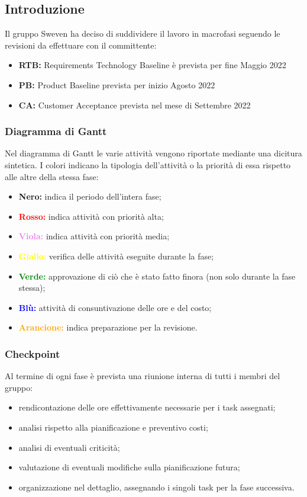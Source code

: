 \subsection{Introduzione}
Il gruppo Sweven ha deciso di suddividere il lavoro in macrofasi seguendo le revisioni da effettuare con il committente:
\begin{itemize}
    \item \textbf{RTB:} Requirements Technology Baseline è prevista per fine Maggio 2022
    \item \textbf{PB:} Product Baseline prevista per inizio Agosto 2022
    \item \textbf{CA:} Customer Acceptance prevista nel mese di Settembre 2022
\end{itemize}

\subsubsection{Diagramma di Gantt}
Nel diagramma di Gantt le varie attività vengono riportate mediante una dicitura sintetica. 
I colori indicano la tipologia dell'attività o la priorità di essa rispetto alle altre della stessa fase:
\begin{itemize}
    \item \textbf{Nero:} indica il periodo dell'intera fase;
    \item \textbf{\textcolor{red}{Rosso:}} indica attività con priorità alta;
    \item \textbf{\textcolor{violet}{Viola:}} indica attività con priorità media;
    \item \textbf{\textcolor{yellow}{Giallo:}} verifica delle attività eseguite durante la fase;
    \item \textbf{\textcolor{green}{Verde:}} approvazione di ciò che è stato fatto finora (non solo durante la fase stessa);
    \item \textbf{\textcolor{blue}{Blù:}} attività di consuntivazione delle ore e del costo;
    \item \textbf{\textcolor{orange}{Arancione:}} indica preparazione per la revisione.
\end{itemize}

\subsubsection{Checkpoint}
Al termine di ogni fase è prevista una riunione interna di tutti i membri del gruppo:
    \begin{itemize}
        \item rendicontazione delle ore effettivamente necessarie per i task assegnati;
        \item analisi rispetto alla pianificazione e preventivo costi;
        \item analisi di eventuali criticità;
        \item valutazione di eventuali modifiche sulla pianificazione futura;
        \item organizzazione nel dettaglio, assegnando i singoli task per la fase successiva. 
    \end{itemize}
